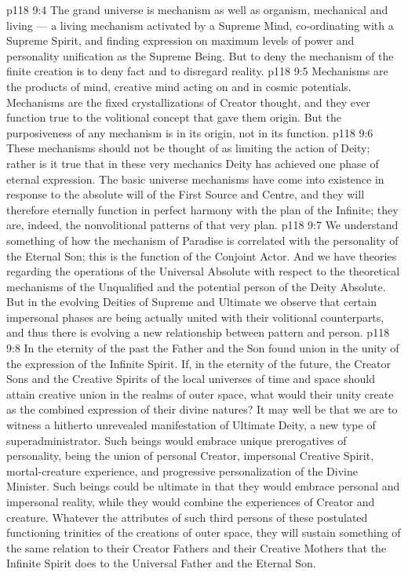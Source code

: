 \vs p118 9:4 The grand universe is mechanism as well as organism, mechanical and living --- a living mechanism activated by a Supreme Mind, co\hyp{}ordinating with a Supreme Spirit, and finding expression on maximum levels of power and personality unification as the Supreme Being. But to deny the mechanism of the finite creation is to deny fact and to disregard reality.
\vs p118 9:5 Mechanisms are the products of mind, creative mind acting on and in cosmic potentials. Mechanisms are the fixed crystallizations of Creator thought, and they ever function true to the volitional concept that gave them origin. But the purposiveness of any mechanism is in its origin, not in its function.
\vs p118 9:6 These mechanisms should not be thought of as limiting the action of Deity; rather is it true that in these very mechanics Deity has achieved one phase of eternal expression. The basic universe mechanisms have come into existence in response to the absolute will of the First Source and Centre, and they will therefore eternally function in perfect harmony with the plan of the Infinite; they are, indeed, the nonvolitional patterns of that very plan.
\vs p118 9:7 We understand something of how the mechanism of Paradise is correlated with the personality of the Eternal Son; this is the function of the Conjoint Actor. And we have theories regarding the operations of the Universal Absolute with respect to the theoretical mechanisms of the Unqualified and the potential person of the Deity Absolute. But in the evolving Deities of Supreme and Ultimate we observe that certain impersonal phases are being actually united with their volitional counterparts, and thus there is evolving a new relationship between pattern and person.
\vs p118 9:8 In the eternity of the past the Father and the Son found union in the unity of the expression of the Infinite Spirit. If, in the eternity of the future, the Creator Sons and the Creative Spirits of the local universes of time and space should attain creative union in the realms of outer space, what would their unity create as the combined expression of their divine natures? It may well be that we are to witness a hitherto unrevealed manifestation of Ultimate Deity, a new type of superadministrator. Such beings would embrace unique prerogatives of personality, being the union of personal Creator, impersonal Creative Spirit, mortal\hyp{}creature experience, and progressive personalization of the Divine Minister. Such beings could be ultimate in that they would embrace personal and impersonal reality, while they would combine the experiences of Creator and creature. Whatever the attributes of such third persons of these postulated functioning trinities of the creations of outer space, they will sustain something of the same relation to their Creator Fathers and their Creative Mothers that the Infinite Spirit does to the Universal Father and the Eternal Son.

